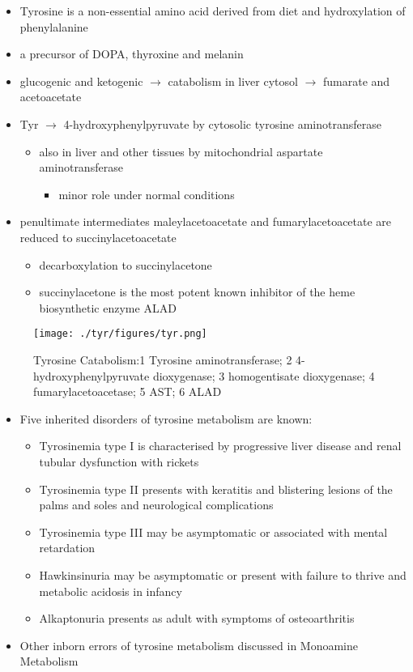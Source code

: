 \documentclass{scrartcl}
\begin{document}
\begin{itemize}
\item Tyrosine is a non-essential amino acid derived from diet and hydroxylation of phenylalanine
\item a precursor of DOPA, thyroxine and melanin
\item glucogenic and ketogenic \(\to\) catabolism in liver cytosol \(\to\) fumarate and acetoacetate
\item Tyr \(\to\) 4-hydroxyphenylpyruvate by cytosolic tyrosine aminotransferase
\begin{itemize}
\item also in liver and other tissues by mitochondrial aspartate aminotransferase
\begin{itemize}
\item minor role under normal conditions
\end{itemize}
\end{itemize}
\item penultimate intermediates maleylacetoacetate and fumarylacetoacetate
are reduced to succinylacetoacetate
\begin{itemize}
\item decarboxylation to succinylacetone
\item succinylacetone is the most potent known inhibitor of the heme biosynthetic enzyme ALAD
\end{itemize}
\end{itemize}

\begin{figure}[htbp]
\centering
\texttt{[image: ./tyr/figures/tyr.png]}
\caption{\label{fig:org9d9a524}
Tyrosine Catabolism:1 Tyrosine aminotransferase; 2 4-hydroxyphenylpyruvate dioxygenase; 3 homogentisate dioxygenase; 4 fumarylacetoacetase; 5 AST; 6 ALAD}
\end{figure}


\begin{itemize}
\item Five inherited disorders of tyrosine metabolism are known:
\begin{itemize}
\item Tyrosinemia type I is characterised by progressive
liver disease and renal tubular dysfunction with rickets
\item Tyrosinemia type II presents with keratitis and
blistering lesions of the palms and soles and neurological
complications
\item Tyrosinemia type III may be asymptomatic or associated with
mental retardation
\item Hawkinsinuria may be asymptomatic or present with failure to
thrive and metabolic acidosis in infancy
\item Alkaptonuria presents as adult with symptoms of osteoarthritis
\end{itemize}
\item Other inborn errors of tyrosine metabolism discussed in Monoamine Metabolism
\end{itemize}
\end{document}

